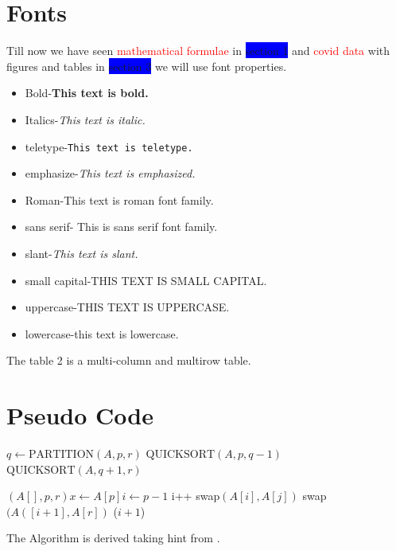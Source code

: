 \documentclass[10pt]{article}
\begin{document}
\section{Fonts}
Till now we have seen \textcolor{red}{ mathematical formulae} in \colorbox{blue}{section 1} and \textcolor{red}{covid data} with figures and tables in \colorbox{blue}{section 3} we will use font properties.



\begin{itemize}

\item Bold-\textbf{This text is bold.}

\item Italics-\textit{This text is italic.}

\item teletype-\texttt{This text is teletype.}

\item emphasize-\emph{This text is emphasized.}

\item Roman-\textrm{This text is roman font family.}

\item sans serif- \textsf{This is sans serif font family.}

\item slant-\textsl{This text is slant.}

\item small capital-\textsc{THIS TEXT IS SMALL CAPITAL.}

\item uppercase-\uppercase{THIS TEXT IS UPPERCASE.}

\item lowercase-this text is lowercase.

\end{itemize}

The table 2 is a multi-column and multirow table.



\newpage
\pagecolor{white}

\section{Pseudo Code}

\begin{algorithmic}
   \State $q\gets \text{PARTITION}(A,p,r)$ 
   \State $\text{QUICKSORT}(A,p,q-1)$ 
   \State $\text{QUICKSORT}(A,q+1,r)$ 
\EndIf
\EndFunction

$(A[],p,r) x\longleftarrow A[p] i \longleftarrow p-1 $
	\State i++
	\State swap$(A[i],A[j])$
	\EndIf
\EndFor
\State swap$(A([i+1],A[r])$
\State \Return ($i+1$)
\EndFunction
\end{algorithmic}
The Algorithm is derived taking hint from \cite{hoare1962quicksort}.



\end{document}
